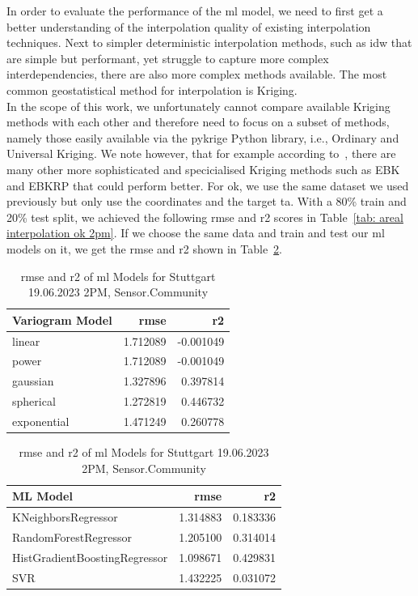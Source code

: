 In order to evaluate the performance of the \gls{ml} model, we need to first get a better understanding of the interpolation quality of existing interpolation techniques. Next to simpler deterministic interpolation methods, such as \gls{idw} that are simple but performant, yet struggle to capture more complex interdependencies, there are also more complex methods available. The most common geostatistical method for interpolation is Kriging.\\
In the scope of this work, we unfortunately cannot compare available Kriging methods with each other and therefore need to focus on a subset of methods, namely those easily available via the pykrige Python library, i.e., Ordinary and Universal Kriging. We note however, that for example according to~\cite{njoku2023effects}, there are many other more sophisticated and specicialised Kriging methods such as EBK and EBKRP that could perform better. For \gls{ok}, we use the same dataset we used previously but only use the coordinates and the target \gls{ta}. With a 80\% train and 20\% test split, we achieved the following \gls{rmse} and \gls{r2} scores in Table~\ref{tab: areal interpolation ok 2pm}. If we choose the same data and train and test our \gls{ml} models on it, we get the \gls{rmse} and \gls{r2} shown in Table~\ref{tab: areal interpolation ml models 2pm}.\\

\begin{table}[ht]
  \centering
  \begin{tabular}{lrr}
  \toprule
  Variogram Model &     \gls{rmse} &        \gls{r2} \\
  \midrule
          linear & 1.712089 & -0.001049 \\
            power & 1.712089 & -0.001049 \\
        gaussian & 1.327896 &  0.397814 \\
        spherical & 1.272819 &  0.446732 \\
      exponential & 1.471249 &  0.260778 \\
  \bottomrule
  \end{tabular}
  \label{tab: areal interpolation ok 2pm}
  \caption{\gls{rmse} and \gls{r2} of Ordinary Kriging for Stuttgart 19.06.2023 2PM, Sensor.Community}

  \begin{tabular}{lrr}
  \toprule
            ML Model &     \gls{rmse} &       \gls{r2} \\
  \midrule
            KNeighborsRegressor & 1.314883 & 0.183336 \\
          RandomForestRegressor & 1.205100 & 0.314014 \\
  HistGradientBoostingRegressor & 1.098671 & 0.429831 \\
                            SVR & 1.432225 & 0.031072 \\
  \bottomrule
  \end{tabular}
  \label{tab: areal interpolation ml models 2pm}
  \caption{\gls{rmse} and \gls{r2} of \gls{ml} Models for Stuttgart 19.06.2023 2PM, Sensor.Community}
\end{table}


